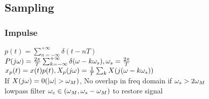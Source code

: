 \subsection{Sampling}
\subsubsection*{Impulse}
$p(t)=\sum_{n=-\infty}^{+\infty} \delta(t-nT)$\\
$P(j\omega)=\frac{2\pi}{T}\sum_{k=-\infty}^{+\infty} \delta(\omega-k\omega_s), \omega_s=\frac{2\pi}{T}$\\
$x_p(t)=x(t)p(t), X_p(j\omega) = \frac{1}{T}\sum_k X(j(\omega-k\omega_s))$\\
If $X(j\om)=0(|\om|>\om_M)$, No overlap in freq domain if $\omega_s>2\omega_M$\\
lowpass filter $\omega_c\in(\omega_M,\omega_s - \omega_M)$ to restore signal